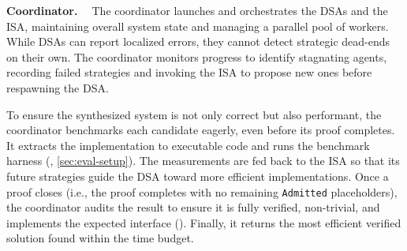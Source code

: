 
\textbf{Coordinator. \ } The coordinator launches and orchestrates the DSAs and the ISA, maintaining overall system state and managing a parallel pool of workers. While DSAs can report localized errors, they cannot detect strategic dead-ends on their own. The coordinator monitors progress to identify stagnating agents, recording failed strategies and invoking the ISA to propose new ones before respawning the DSA. 
 
To ensure the synthesized system is not only correct but also performant, the coordinator benchmarks each candidate eagerly, even before its proof completes. It extracts the implementation to executable code and runs the benchmark harness (, \cref{sec:eval-setup}). The measurements are fed back to the ISA so that its future strategies guide the DSA toward more efficient implementations. Once a proof closes (i.e., the proof completes with no remaining \texttt{Admitted} placeholders), the coordinator audits the result to ensure it is fully verified, non-trivial, and implements the expected interface (). Finally, it returns the most efficient verified solution found within the time budget. 


 

